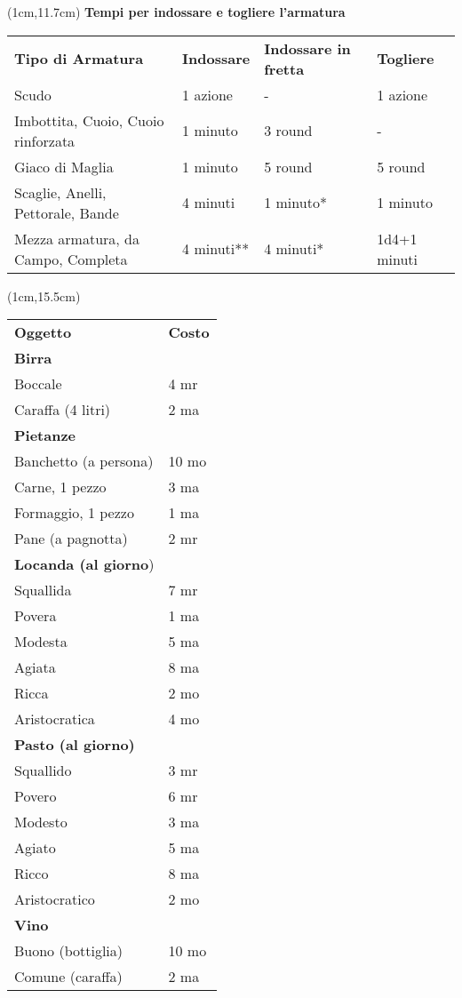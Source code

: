 \documentclass[a4paper,12 pt,openany]{book}
\begin{document}
	\begin{textblock*}{19cm}(1cm,11.7cm) %
\textbf{Tempi per indossare e togliere l'armatura}\\

\begin{tabular}{llll}
	\textbf{Tipo di Armatura}& \textbf{Indossare} & \textbf{Indossare in fretta} & \textbf{Togliere}\\
	Scudo								& 1 azione 	& -     	& 1 azione\\
	Imbottita, Cuoio, Cuoio rinforzata  & 1 minuto	& 3 round  	& - \\
	Giaco di Maglia						& 1 minuto	& 5 round  & 5 round\\
	Scaglie, Anelli, Pettorale, Bande   & 4 minuti 	& 1 minuto{*}  & 1 minuto\\
	Mezza armatura, da Campo, Completa  & 4 minuti{*}{*}& 4 minuti{*}& 1d4+1 minuti\\
\end{tabular}

\end{textblock*}

	\begin{textblock*}{6cm}(1cm,15.5cm) %

\begin{tabular}{ll}
	\textbf{Oggetto}&\textbf{Costo}\\
	\textbf{Birra}&\\
	Boccale&4 mr\\
	Caraffa (4 litri)&2 ma\\
	\textbf{Pietanze} &\\
	Banchetto (a persona)&10 mo\\
	Carne, 1 pezzo&3 ma\\
	Formaggio, 1 pezzo&1 ma\\
	Pane (a pagnotta)&2 mr\\
	\textbf{Locanda (al giorno})&\\
	Squallida&7 mr\\
	Povera&1 ma\\
	Modesta&5 ma\\
	Agiata&8 ma\\
	Ricca&2 mo\\
	Aristocratica&4 mo\\
	\textbf{Pasto (al giorno)}&\\
	Squallido&3 mr\\
	Povero&6 mr\\
	Modesto&3 ma\\
	Agiato&5 ma\\
	Ricco&8 ma\\
	Aristocratico&2 mo\\
	\textbf{Vino}&\\
	Buono (bottiglia)&10 mo\\
	Comune (caraffa)&2 ma\\
\end{tabular}

\end{textblock*}
\end{document}
